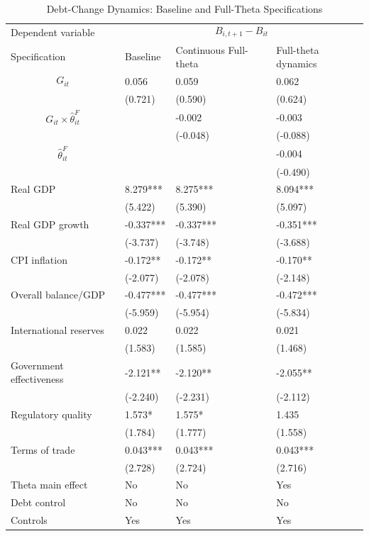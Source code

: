 \begin{table}[H]\centering
\begin{threeparttable}
\caption{Debt-Change Dynamics: Baseline and Full-Theta Specifications}
\label{tab:debt_change_combined_fulltheta}
\scriptsize
\begin{tabularx}{\textwidth}{lYYY}
\toprule
Dependent variable &  \\
\cmidrule(lr){2-4}
Specification & Baseline & Continuous Full-theta & Full-theta dynamics \\
\midrule
$$G_{it}$$ & 0.056 & 0.059 & 0.062 \\
 & (0.721) & (0.590) & (0.624) \\
$$G_{it}\times\widehat{\theta}^{F}_{it}$$ &  & -0.002 & -0.003 \\
 &  & (-0.048) & (-0.088) \\
$$\widehat{\theta}^{F}_{it}$$ &  &  & -0.004 \\
 &  &  & (-0.490) \\
Real GDP & 8.279*** & 8.275*** & 8.094*** \\
 & (5.422) & (5.390) & (5.097) \\
Real GDP growth & -0.337*** & -0.337*** & -0.351*** \\
 & (-3.737) & (-3.748) & (-3.688) \\
CPI inflation & -0.172** & -0.172** & -0.170** \\
 & (-2.077) & (-2.078) & (-2.148) \\
Overall balance/GDP & -0.477*** & -0.477*** & -0.472*** \\
 & (-5.959) & (-5.954) & (-5.834) \\
International reserves & 0.022 & 0.022 & 0.021 \\
 & (1.583) & (1.585) & (1.468) \\
Government effectiveness & -2.121** & -2.120** & -2.055** \\
 & (-2.240) & (-2.231) & (-2.112) \\
Regulatory quality & 1.573* & 1.575* & 1.435 \\
 & (1.784) & (1.777) & (1.558) \\
Terms of trade & 0.043*** & 0.043*** & 0.043*** \\
 & (2.728) & (2.724) & (2.716) \\
\midrule
Theta main effect & No & No & Yes \\
Debt control & No & No & No \\
Controls & Yes & Yes & Yes \\

\end{tabularx}
\end{threeparttable}
\end{table}
